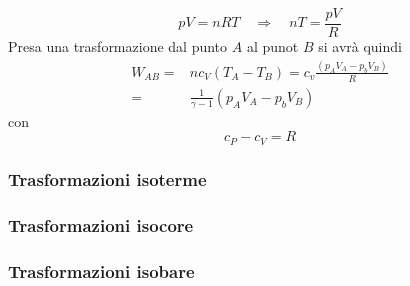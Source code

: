 \documentclass[x11names]{article}
\begin{document}
	\[ 
	pV = nRT \quad \Rightarrow \quad nT = \frac{pV}{R}
	\]
	Presa una trasformazione dal punto \(A\) al punot \(B\) si avrà quindi
	\begin{align*}
		W_{AB} =& nc_{V}(T_{A} - T_{B}) = c_{v}\frac{(p_{A}V_{A} - p_{b}V_{B})}{R} \\
			   =& \frac{1}{\gamma -1}(p_{A}V_{A} - p_{b}V_{B})
	\end{align*}
	con 
	\[ 
	\boxed{c_{P} - c_{V} = R}
	\]
	
	\subsubsection{Trasformazioni isoterme}
	\subsubsection{Trasformazioni isocore}
	\subsubsection{Trasformazioni isobare}
	
	
\end{document}
